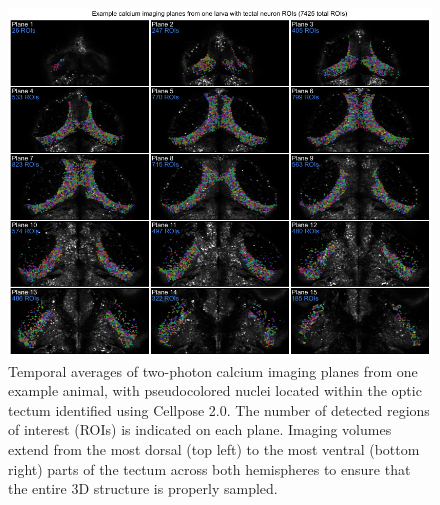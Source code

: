 \documentclass{article}
\begin{document}
\newpage

\begin{figure}[t]
    \centering
    \includegraphics[width=1.0\linewidth]{figures/supp_imagingplanes.pdf}
    \caption{Temporal averages of two-photon calcium imaging planes from one example animal, with pseudocolored nuclei located within the optic tectum identified using Cellpose 2.0. The number of detected regions of interest (ROIs) is indicated on each plane. Imaging volumes extend from the most dorsal (top left) to the most ventral (bottom right) parts of the tectum across both hemispheres to ensure that the entire 3D structure is properly sampled.}
    \label{supp_imagingplanes}
\end{figure}

\newpage
\end{document}
